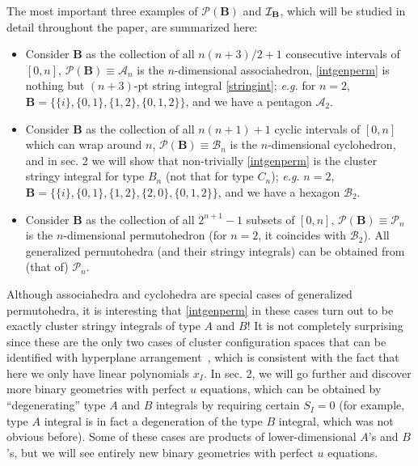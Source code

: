 \documentclass[hidelinks,12pt]{article}
\begin{document}
The most important three examples of ${\mathscr P} (\mathbf B)$ and ${\cal I}_{\mathbf B}$, which will be studied in detail throughout the paper, are summarized here:
\begin{itemize}
\item Consider $\mathbf B$ as the collection of all $n(n{+}3)/2+1$ consecutive intervals of $[0,n]$, ${\mathscr P}(\mathbf B) \equiv {\mathscr A}_n$ is the $n$-dimensional associahedron, \eqref{intgenperm} is nothing but $(n{+}3)$-pt string integral \eqref{stringint}; {\it e.g.} for $n=2$, ${\mathbf B}=\{\{i\}, \{0,1\}, \{1,2\}, \{0,1,2\}\}$, and we have a pentagon ${\mathscr A}_2$.
\item Consider $\mathbf B$ as the collection of all $n(n{+}1)+1$ cyclic intervals of $[0,n]$ which can wrap around $n$, ${\mathscr P} (\mathbf B) \equiv {\mathscr B}_n$ is the $n$-dimensional cyclohedron, and in sec. 2 we will show that non-trivially \eqref{intgenperm} is the cluster stringy integral for type $B_n$ (not that for type $C_n$); {\it e.g.} $n=2$, ${\mathbf B}=\{\{i\}, \{0,1\}, \{1,2\}, \{2,0\}, \{0,1,2\}\}$, and we have a hexagon ${\mathscr B}_2$.
\item Consider $\mathbf B$ as the collection of all $2^{n{+}1}-1$ subsets of $[0,n]$, ${\mathscr P}(\mathbf B) \equiv {\mathscr P}_n$ is the $n$-dimensional permutohedron (for $n=2$, it coincides with ${\mathscr B}_2$). All generalized permutohedra (and their stringy integrals) can be obtained from (that of) ${\mathscr P}_n$. 
\end{itemize}

Although associahedra and cyclohedra are special cases of generalized permutohedra, it is interesting that \eqref{intgenperm} in these cases turn out to be exactly cluster stringy integrals of type $A$ and $B$! It is not completely surprising since these are the only two cases of cluster configuration spaces that can be identified with hyperplane arrangement~\cite{Arkani-Hamed:tobeappear}, which is consistent with the fact that here we only have linear polynomials $x_I$. In sec. 2, we will go further and discover more binary geometries with perfect $u$ equations, which can be obtained by ``degenerating'' type $A$ and $B$ integrals by requiring certain $S_I=0$ (for example, type $A$ integral is in fact a degeneration of the type $B$ integral, which was not obvious before). Some of these cases are products of lower-dimensional $A$'s and $B$'s, but we will see entirely new binary geometries with perfect $u$ equations. 
\end{document}
